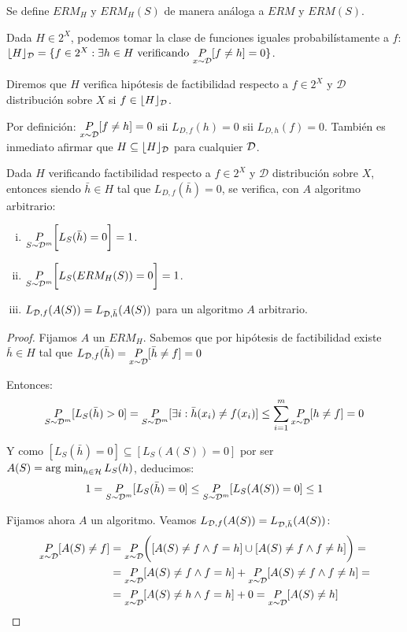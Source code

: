 Se define $ERM_H$ y $ERM_H(S)$ de manera análoga a $ERM$ y $ERM(S)$.

Dada $H\in 2^X$, podemos tomar la clase de funciones iguales probabilístamente a $f$:
$\lfloor H \rfloor_{\mathcal{D}} = \{f\in 2^X: \exists h\in H \textrm{ verificando }\underset{x\sim \mathcal{D}}{P}[f\neq h] = 0\}$.

\begin{definition}

Diremos que $H$ verifica hipótesis de factibilidad respecto a $f\in 2^X$ y $\mathcal{D}$ distribución sobre 
$X$ si $f\in \lfloor H \rfloor_{\mathcal{D}}$. 
\end{definition}

Por definición: $\underset{x\sim \mathcal{D}}{P}[f\neq h]=0$ sii $L_{D,f}(h) = 0$ sii $L_{D,h}(f) = 0$. También es inmediato afirmar que
$H \subseteq \lfloor H \rfloor_{\mathcal{D}}$ para cualquier $\mathcal{D}$.

\begin{fact}
Dada $H$ verificando factibilidad respecto a $f\in 2^X$ y $\mathcal{D}$ distribución sobre $X$, entonces siendo 
${\bar{h}} \in H$ tal que $L_{D,f}(\bar{h}) = 0$, se verifica, con $A$ algoritmo arbitrario:
\begin{enumerate}[i.]
\item $\underset{S\sim \mathcal{D}^m}{P} \bigg[L_S(\bar{h}) = 0 \bigg] = 1$.
\item $\underset{S\sim \mathcal{D}^m}{P} \bigg[L_S(ERM_H(S)) = 0 \bigg] = 1$.
\item $L_{\mathcal{D},f}(A(S)) = L_{\mathcal{D},\bar{h}}(A(S))$ para un algoritmo $A$ arbitrario.
\end{enumerate}
\label{fact:factibilidad}
\end{fact}

\begin{proof}
Fijamos $A$ un $ERM_H$. Sabemos que por hipótesis de factibilidad existe $\bar{h} \in H$ tal que
$L_{\mathcal{D},f}(\bar{h}) = \underset{x\sim \mathcal{D}}{P}[\bar{h}\neq f] = 0$

Entonces: \[\underset{S\sim \mathcal{D}^m}{P}[L_S(\bar{h}) > 0] = \underset{S\sim \mathcal{D}^m}{P}
[\exists i: \bar{h}(x_i) \neq f(x_i)] \le \sum_{i=1}^m \underset{x\sim \mathcal{D}}{P}[h\neq f] = 0\]

Y como $[L_S(\bar{h}) = 0] \subseteq [L_S(A(S)) = 0]$ por ser $A(S) = \operatorname*{arg\,\min}_{h\in \mathcal{H}} L_S(h)$, deducimos:
\[1 = \underset{S\sim \mathcal{D}^m}{P}[L_S(\bar{h}) = 0] \le \underset{S\sim \mathcal{D}^m}{P}[L_S(A(S)) = 0] \le 1\]

Fijamos ahora $A$ un algoritmo. Veamos $L_{\mathcal{D},f}(A(S)) = L_{\mathcal{D},\bar{h}}(A(S))$:
  \begin{align*}
  \underset{x\sim \mathcal{D}}{P}[A(S) \neq f] &= \underset{x\sim \mathcal{D}}{P}\bigg([A(S) \neq f \wedge f=h] \cup[A(S) \neq f \wedge f\neq h]\bigg) = \\
  &= \underset{x\sim \mathcal{D}}{P}[A(S) \neq f \wedge f=h] + \underset{x\sim \mathcal{D}}{P}[A(S) \neq f \wedge f\neq h] = \\
  &= \underset{x\sim \mathcal{D}}{P}[A(S) \neq h \wedge f=h] + 0 = \underset{x\sim \mathcal{D}}{P}[A(S)\neq h]
  \end{align*}
\end{proof}

